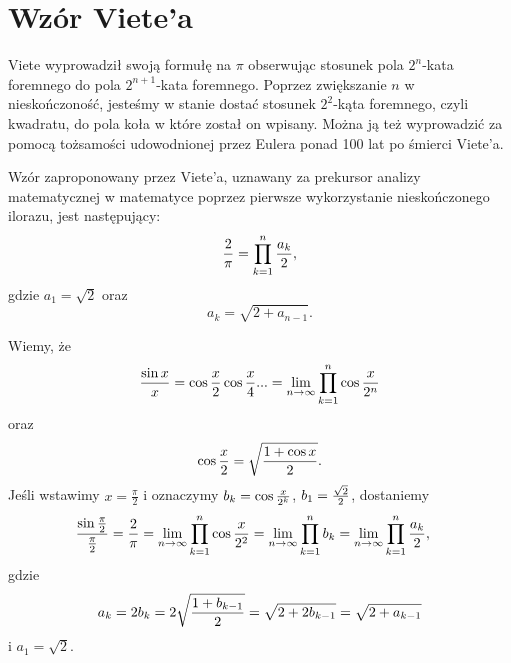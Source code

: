 \section{Wzór Viete'a}


Viete wyprowadził swoją formułę na $\pi$ obserwując stosunek pola $2^n$-kata foremnego do pola $2^{n+1}$-kata foremnego. Poprzez zwiększanie $n$ w nieskończoność, jesteśmy w stanie dostać stosunek $2^2$-kąta foremnego, czyli kwadratu, do pola koła w które został on wpisany. Można ją też wyprowadzić za pomocą tożsamości udowodnionej przez Eulera ponad 100 lat po śmierci Viete'a.

Wzór zaproponowany przez Viete'a, uznawany za prekursor analizy matematycznej w matematyce poprzez pierwsze wykorzystanie nieskończonego ilorazu, jest następujący:
\begin{equation}
    {2\over\pi}=\prod\limits_{k=1}^n{a_k\over2},
\end{equation}
gdzie $a_1=\sqrt2$ oraz
$$a_k=\sqrt{2+a_{n-1}}.$$

Wiemy, że
$${\sin x\over x}=\cos\frac x2\cos\frac x4...=\lim_{n\to\infty}\prod\limits_{k=1}^n\cos{x\over 2^n}$$
oraz
$$\cos\frac x2=\sqrt{{1+\cos x\over 2}}.$$
Jeśli wstawimy $x=\frac\pi2$ i oznaczymy $b_k=\cos{x\over 2^k}$, $b_1={\sqrt2\over2}$,  dostaniemy
\begin{align*}
    {\sin\frac\pi2\over\frac\pi2}&=\frac2\pi=\lim_{n\to\infty}\prod\limits_{k=1}^n\cos{x\over 2^2}=\lim_{n\to\infty}\prod\limits_{k=1}^nb_k=\lim_{n\to\infty}\prod\limits_{k=1}^n{a_k\over 2},
\end{align*}
gdzie 
$$a_k=2b_k=2\sqrt{{1+b_{k-1}\over 2}}=\sqrt{2+2b_{k-1}}=\sqrt{2+a_{k-1}}$$
i $a_1=\sqrt2$.